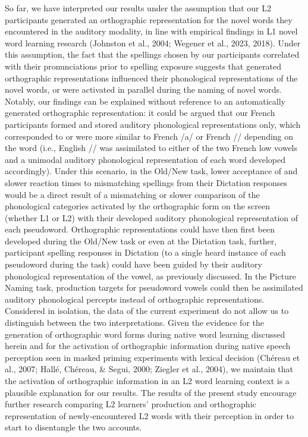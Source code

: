 \documentclass[
  english,
  man,floatsintext]{apa7}
\begin{document}
So far, we have interpreted our results under the assumption that our L2 participants generated an orthographic representation for the novel words they encountered in the auditory modality, in line with empirical findings in L1 novel word learning research (Johnston et al., 2004; Wegener et al., 2023, 2018). Under this assumption, the fact that the spellings chosen by our participants correlated with their pronunciations prior to spelling exposure suggests that generated orthographic representations influenced their phonological representations of the novel words, or were activated in parallel during the naming of novel words. Notably, our findings can be explained without reference to an automatically generated orthographic representation: it could be argued that our French participants formed and stored auditory phonological representations only, which corresponded to or were more similar to French /a/ or French /\textopeno / depending on the word (i.e., English /\textscripta / was assimilated to either of the two French low vowels and a unimodal auditory phonological representation of each word developed accordingly). Under this scenario, in the Old/New task, lower acceptance of and slower reaction times to mismatching spellings from their Dictation responses would be a direct result of a mismatching or slower comparison of the phonological categories activated by the orthographic form on the screen (whether L1 or L2) with their developed auditory phonological representation of each pseudoword. Orthographic representations could have then first been developed during the Old/New task or even at the Dictation task, further, participant spelling responses in Dictation (to a single heard instance of each pseudoword during the task) could have been guided by their auditory phonological representation of the vowel, as previously discussed. In the Picture Naming task, production targets for pseudoword vowels could then be assimilated auditory phonological percepts instead of orthographic representations. Considered in isolation, the data of the current experiment do not allow us to distinguish between the two interpretations. Given the evidence for the generation of orthographic word forms during native word learning discussed herein and for the activation of orthographic information during native speech perception seen in masked priming experiments with lexical decision (Chéreau et al., 2007; Hallé, Chéreau, \& Segui, 2000; Ziegler et al., 2004), we maintain that the activation of orthographic information in an L2 word learning context is a plausible explanation for our results. The results of the present study encourage further research comparing L2 learners' production and orthographic representation of newly-encountered L2 words with their perception in order to start to disentangle the two accounts.
\end{document}
